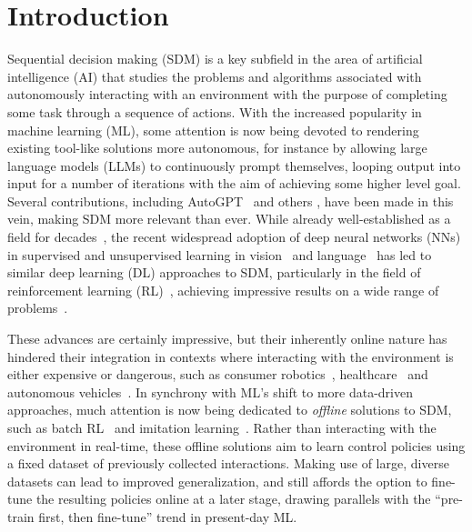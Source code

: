 \documentclass[../main.tex]{subfiles}
\begin{document}
\chapter{Introduction}


Sequential decision making (SDM) is a key subfield in the area of artificial intelligence (AI) that studies the problems and algorithms associated with autonomously interacting with an
environment with the purpose of completing some task through a sequence of actions. With the increased popularity in machine
learning (ML), some attention is now being devoted to rendering existing tool-like solutions more
autonomous, for instance by allowing large language models (LLMs) to continuously prompt themselves, looping output into input for a number of iterations with the aim of achieving some higher level goal. Several contributions, including AutoGPT~\citep{yang_auto-gpt_2023} and others \citep{park_generative_2023, bakhtin_human-level_2022, zhou_agents_2023}, have been made in this vein, making SDM
more relevant than ever. While already well-established as a field for
decades~\citep{minsky_theory_1954, bellman_dynamic_1957, klopf_brain_1972, bryson_optimal_1996}, the
recent widespread adoption of deep neural networks (NNs) in supervised and unsupervised learning in
vision~\citep{krizhevsky_imagenet_2012, he_deep_2016, mildenhall_nerf_2021} and
language~\citep{mikolov_distributed_2013, vaswani_attention_2017, devlin_bert_2019,
	brown_language_2020} has led to similar deep learning (DL) approaches to SDM, particularly in the
field of reinforcement learning (RL)~\citep{sutton_reinforcement_2018}, achieving impressive results
on a wide range of problems~\citep{mnih_playing_2013, silver_general_2018, openai_dota_2019,
	fawzi_discovering_2022}.

These advances are certainly impressive, but their inherently online nature has hindered
their integration in contexts where interacting with the environment is either expensive or
dangerous, such as consumer robotics~\citep{singh_reinforcement_2022},
healthcare~\citep{liu_reinforcement_2020} and autonomous vehicles~\citep{kiran_deep_2022}. In
synchrony with ML's shift to more data-driven approaches, much attention is now being dedicated to
\textit{offline} solutions to SDM, such as batch RL~\citep{levine_offline_2020,
	prudencio_survey_2022} and imitation learning~\citep{schaal_is_1999}. Rather than interacting with
the environment in real-time, these offline solutions aim to learn control policies using a fixed
dataset of previously collected interactions. Making use of large, diverse datasets can lead to
improved generalization, and still affords the option to fine-tune the resulting policies online at
a later stage, drawing parallels with the ``pre-train first, then fine-tune'' trend in present-day
ML.
\end{document}
